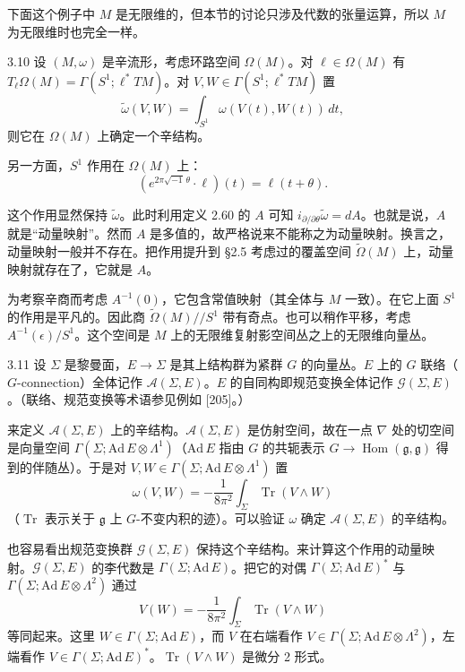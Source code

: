 
下面这个例子中 $M$ 是无限维的，但本节的讨论只涉及代数的张量运算，所以 $M$ 为无限维时也完全一样。

\begin{example}{3.10}
  设 $(M,\omega)$ 是辛流形，考虑环路空间 $\Omega(M)$。对 $\ell\in\Omega(M)$ 有 $T_\ell\Omega(M)=\Gamma(S^1;\ell^*TM)$。对 $V,W\in\Gamma(S^1;\ell^*TM)$ 置
  \[
    \tilde\omega(V,W)=\int_{S^1}\omega(V(t),W(t))\,dt,
  \]
  则它在 $\Omega(M)$ 上确定一个辛结构。

  另一方面，$S^1$ 作用在 $\Omega(M)$ 上：
  \[
    (e^{2\pi\sqrt{-1}\,\theta}\cdot\ell)(t)=\ell(t+\theta).
  \]
\end{example}

这个作用显然保持 $\tilde\omega$。此时利用定义 2.60 的 $A$ 可知 $i_{\partial/\partial\theta}\tilde\omega=dA$。也就是说，$A$ 就是“动量映射”。然而 $A$ 是多值的，故严格说来不能称之为动量映射。换言之，动量映射一般并不存在。把作用提升到 §2.5 考虑过的覆盖空间 $\tilde\Omega(M)$ 上，动量映射就存在了，它就是 $A$。

为考察辛商而考虑 $A^{-1}(0)$，它包含常值映射（其全体与 $M$ 一致）。在它上面 $S^1$ 的作用是平凡的。因此商 $\tilde\Omega(M)/\!/S^1$ 带有奇点。也可以稍作平移，考虑 $A^{-1}(\epsilon)/S^1$。这个空间是 $M$ 上的无限维复射影空间丛之上的无限维向量丛。

\begin{example}{3.11}
  设 $\Sigma$ 是黎曼面，$E\to\Sigma$ 是其上结构群为紧群 $G$ 的向量丛。$E$ 上的 $G$ 联络（$G$-connection）全体记作 $\mathcal{A}(\Sigma,E)$。$E$ 的自同构即规范变换全体记作 $\mathcal{G}(\Sigma,E)$。（联络、规范变换等术语参见例如 [205]。）

  来定义 $\mathcal{A}(\Sigma,E)$ 上的辛结构。$\mathcal{A}(\Sigma,E)$ 是仿射空间，故在一点 $\nabla$ 处的切空间是向量空间 $\Gamma(\Sigma;\mathrm{Ad}\,E\otimes\Lambda^1)$（$\mathrm{Ad}\,E$ 指由 $G$ 的共轭表示 $G\to\operatorname{Hom}(\mathfrak{g},\mathfrak{g})$ 得到的伴随丛）。于是对 $V,W\in\Gamma(\Sigma;\mathrm{Ad}\,E\otimes\Lambda^1)$ 置
  \[
    \omega(V,W)=-\frac{1}{8\pi^2}\int_\Sigma\operatorname{Tr}(V\wedge W)
  \]
  （$\operatorname{Tr}$ 表示关于 $\mathfrak{g}$ 上 $G$-不变内积的迹）。可以验证 $\omega$ 确定 $\mathcal{A}(\Sigma,E)$ 的辛结构。

  也容易看出规范变换群 $\mathcal{G}(\Sigma,E)$ 保持这个辛结构。来计算这个作用的动量映射。$\mathcal{G}(\Sigma,E)$ 的李代数是 $\Gamma(\Sigma;\mathrm{Ad}\,E)$。把它的对偶 $\Gamma(\Sigma;\mathrm{Ad}\,E)^*$ 与 $\Gamma(\Sigma;\mathrm{Ad}\,E\otimes\Lambda^2)$ 通过
  \begin{equation}
    V(W)=-\frac{1}{8\pi^2}\int_\Sigma\operatorname{Tr}(V\wedge W) \tag{3.2}
  \end{equation}
  等同起来。这里 $W\in\Gamma(\Sigma;\mathrm{Ad}\,E)$，而 $V$ 在右端看作 $V\in\Gamma(\Sigma;\mathrm{Ad}\,E\otimes\Lambda^2)$，左端看作 $V\in\Gamma(\Sigma;\mathrm{Ad}\,E)^*$。$\operatorname{Tr}(V\wedge W)$ 是微分 2 形式。
\end{example}

